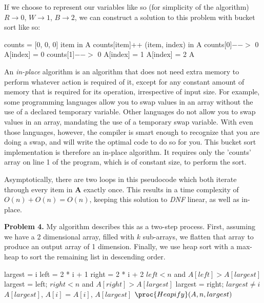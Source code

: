 \documentclass{article}
\begin{document}
If we choose to represent our variables like so (for simplicity of the algorithm) $R \rightarrow 0$, $W \rightarrow 1$, $B \rightarrow 2$, we can construct a solution to this problem with bucket sort like so:

\begin{codebox}
    \li counts = [0, 0, 0]
    \li
    \li \For item in A \Do
    \li counts[item]++ \End
    \li
    \li \For (item, index) in A \Do
    \li \If counts[0]$-- >$ 0 \Then
    \li A[index] = 0
    \li \ElseIf counts[1]$-- >$ 0 \Then
    \li A[index] = 1 
    \li \Else
    \li A[index] = 2 \End \End
    \li \Return A
\end{codebox}

An \emph{in-place} algorithm is an algorithm that does not need extra memory to perform whatever action is required of it, except for any constant amount of memory that is required for its operation, irrespective of input size. For example, some programming languages allow you to swap values in an array without the use of a declared temporary variable. Other languages do not allow you to swap values in an array, mandating the use of a temporary swap variable. With even those languages, however, the compiler is smart enough to recognize that you are doing a swap, and will write the optimal code to do so for you. This bucket sort implementation is therefore an in-place algorithm. It requires only the 'counts' array on line 1 of the program, which is of constant size, to perform the sort.

Asymptotically, there are two loops in this pseudocode which both iterate through every item in $\pmb A$ exactly once. This results in a time complexity of $O(n) + O(n) = O(n)$, keeping this solution to \emph{DNF} linear, as well as in-place.

\hfill

\textbf{Problem 4.} My algorithm describes this as a two-step process. First, assuming we have a 2 dimensional array, filled with $k$ sub-arrays, we flatten that array to produce an output array of 1 dimension. Finally, we use heap sort \cite{website:4} with a max-heap to sort the remaining list in descending order. 

\begin{codebox}
    \li largest = i
    \li left = 2 * i + 1
    \li right = 2 * i + 2
    \li
    \li \If $left < n$ and $A[left] > A[largest]$
    \li \Then largest = left; \End
    \li
    \li \If $right < n$ and $A[right] > A[largest]$
    \li \Then largest = right; \End
    \li
    \li \If $largest \neq i$
    \li \Then $A[largest]$, $A[i]$ = $A[i]$, $A[largest]$
    \li $\proc{Heapify}(A, n, largest)$ \End
\end{codebox}
\end{document}
